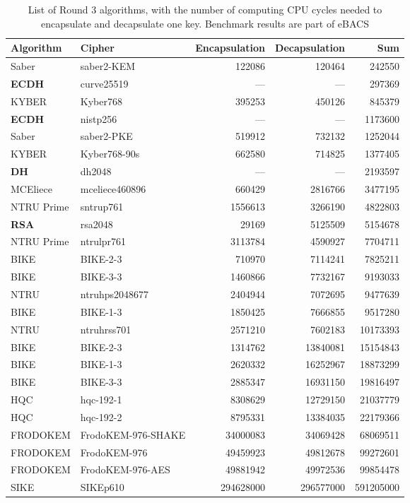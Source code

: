 \begin{table}[ht]
  \small
  \caption{List of Round 3 algorithms, with the number of computing \acs{CPU} cycles needed to encapsulate and decapsulate one key. Benchmark results are part of eBACS\cite{eBACS}}
  \begin{center}
      \begin{tabularx}{\textwidth}{X|lrrr}
      \hline
      \textbf{Algorithm} & \textbf{Cipher}  & \textbf{Encapsulation}  & \textbf{Decapsulation}  & \textbf{Sum}  \\
      \hline
      Saber & saber2-KEM & 122086 & 120464 & 242550 \\
      \textbf{ECDH} & curve25519 & --- & --- & 297369 \\
      KYBER & Kyber768 & 395253 & 450126 & 845379 \\
      \textbf{ECDH} & nistp256 & --- & --- & 1173600 \\
      Saber & saber2-PKE & 519912 & 732132 & 1252044 \\
      KYBER & Kyber768-90s & 662580 & 714825 & 1377405 \\
      \textbf{DH} & dh2048  & --- & --- & 2193597 \\
      MCEliece & mceliece460896 & 660429 & 2816766 & 3477195 \\
      NTRU Prime & sntrup761 & 1556613 & 3266190 & 4822803 \\
      \textbf{RSA} & rsa2048 & 29169 & 5125509 & 5154678 \\
      NTRU Prime & ntrulpr761 & 3113784 & 4590927 & 7704711 \\
      BIKE & BIKE-2-3 & 710970 & 7114241 & 7825211 \\
      BIKE & BIKE-3-3 & 1460866 & 7732167 & 9193033 \\
      NTRU & ntruhps2048677 & 2404944 & 7072695 & 9477639 \\
      BIKE & BIKE-1-3 & 1850425 & 7666855 & 9517280 \\
      NTRU & ntruhrss701 & 2571210 & 7602183 & 10173393 \\
      BIKE & BIKE-2-3 & 1314762 & 13840081 & 15154843 \\
      BIKE & BIKE-1-3 & 2620332 & 16252967 & 18873299 \\
      BIKE & BIKE-3-3 & 2885347 & 16931150 & 19816497 \\
      HQC & hqc-192-1 & 8308629 & 12729150 & 21037779 \\
      HQC & hqc-192-2 & 8795331 & 13384035 & 22179366 \\
      FRODOKEM & FrodoKEM-976-SHAKE & 34000083 & 34069428 & 68069511 \\
      FRODOKEM & FrodoKEM-976 & 49459923 & 49812678 & 99272601 \\
      FRODOKEM & FrodoKEM-976-AES & 49881942 & 49972536 & 99854478 \\
      SIKE & SIKEp610 & 294628000 & 296577000 & 591205000 \\
      \hline
  \end{tabularx}
  \end{center}
  \label{table:r3_enc_dec}
\end{table}




